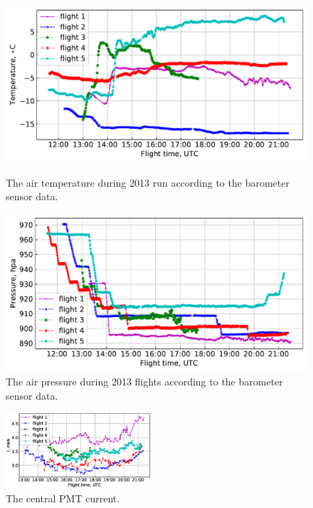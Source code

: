\documentclass[final,5p,times,twocolumn]{elsarticle}
\begin{document}
\begin{figure}[tb]
    \begin{minipage}[t]{0.48\textwidth}
    \centering
    \includegraphics[width=\textwidth]{figs/T1.pdf}
    \caption{The air temperature during 2013 run according to the barometer sensor data.}
    \label{fig:temperature}
    \end{minipage}
    \hfill
    \begin{minipage}[t]{0.48\textwidth}
    \centering
    \includegraphics[width=\textwidth]{figs/P_hpa0.pdf}
    \caption{The air pressure during 2013 flights according to the barometer sensor data.}
    \label{fig:pressure}
    \end{minipage}
\end{figure}

\begin{figure}[tb]
\includegraphics[width=0.48\textwidth]{figs/cur2013_PMT1.eps}
\caption{The central PMT current.}
\label{fig:current}
\end{figure}
\end{document}
